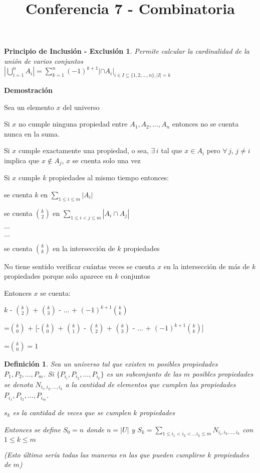 \documentclass[a4paper,12pt]{report}
\title{Conferencia 7 - Combinatoria}
\author{}
\newtheorem*{pie}{Principio de Inclusión - Exclusión}
\newtheorem*{dfn}{Definición}
\begin{document}
\maketitle


\begin{pie}
Permite calcular la cardinalidad de la unión de varios conjuntos\\
 $|\bigcup^n_{i=1}A_i|=\sum^n_{k=1}(-1)^{k+1}|\cap A_i|_{i\in I\subseteq\{1,2,\dots,n\},|I|=k}$
\end{pie}

\textbf{Demostración}

Sea un elemento $x$ del universo

Si $x$ no cumple ninguna propiedad entre $A_1,A_2,\dots,A_n$ entonces no se cuenta nunca en la suma.

Si $x$ cumple exactamente una propiedad, o sea, $\exists \, i$ tal que  $x\in A_i$ pero $\forall \, j$, $j\neq i$ implica que $x\not \in A_j$, $x$ se cuenta solo una vez

Si $x$ cumple $k$ propiedades al mismo tiempo entonces:

se cuenta $k$ en $\sum_{1\leq i \leq m}|A_i|$

se cuenta ${k}\choose{2}$ en $\sum_{1\leq i < j\leq m}|A_i\cap A_j|$

$\dots$

$\dots$

se cuenta ${k}\choose{k}$ en la intersección de $k$ propiedades

No tiene sentido verificar cuántas veces se cuenta $x$ en la intersección de más de $k$ propiedades porque solo aparece en $k$ conjuntos

Entonces $x$ se cuenta:

$k$ - $k\choose 2$ + $k\choose 3$ - $\dots$ + $(-1)^{k+1}$$k\choose k$

=$k\choose 0$ + [-$k\choose 0$ + $k\choose 1$ - $k\choose 2$ + $k\choose 3$ - $\dots$ + $(-1)^{k+1}$$k\choose k$]

=$k\choose 0$$=1$




\begin{dfn}
Sea un universo tal que existen $m$ posibles propiedades $P_1,P_2,\dots,P_m$. Si $\{P_{i_i},P_{i_2},\dots,P_{i_k}\}$ es un subconjunto de las $m$ posibles propiedades se denota 
$N_{i_i,i_2,\dots,i_k}$ a la cantidad de elementos que cumplen las propiedades 
$P_{i_1},P_{i_2},\dots,P_{i_m}$. 

$s_k$ es la cantidad de veces que se cumplen $k$ propiedades
 
Entonces se define $S_0=n$ donde $n=|U|$ y 
$S_k=\sum_{1\leq i_1 < i_2 < \dots i_k \leq m} N_{i_i,i_2,\dots,i_k}$ con $1\leq k \leq m$

(Esto último sería todas las maneras en las que pueden cumplirse $k$ propiedades de $m$)
\end{dfn}
\end{document}
